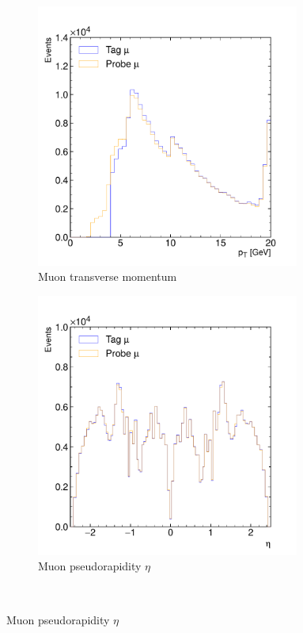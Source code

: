 \begin{figure}[htbp]
	\centering
	\begin{subfigure}[b]{0.45\textwidth}
		\centering
		\includegraphics[width=0.95\textwidth]{figures/muontrigger/l1mu4/l1mu4_muon_pt.pdf}
		\caption{Muon transverse momentum \pt}
	\end{subfigure}
	\begin{subfigure}[b]{0.45\textwidth}
		\centering
		\includegraphics[width=0.95\textwidth]{figures/muontrigger/l1mu4/l1mu4_muon_eta.pdf}
		\caption{Muon pseudorapidity \(\eta\)}
	\end{subfigure} \\


\end{figure}

